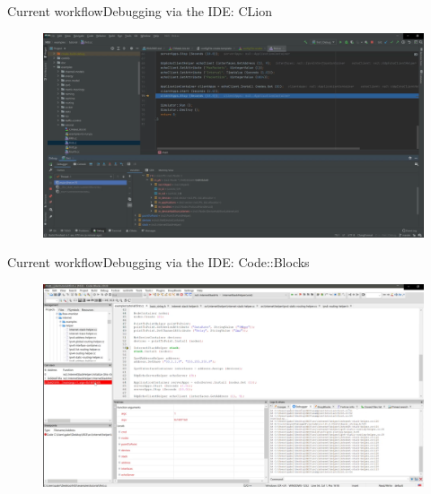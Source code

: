 \documentclass[12pt]{beamer}
\begin{document}
\begin{frame}{Current workflow}{Debugging via the IDE: CLion}
    \begin{figure}[h]
        \vspace{-2em}
        \hspace{-2em}
        \includegraphics[width=0.9\linewidth]{debug_clion.png}
    \end{figure}
\end{frame} 

\begin{frame}{Current workflow}{Debugging via the IDE: Code::Blocks}
    \begin{figure}[h]
        \vspace{-2em}
        \hspace{-2em}
        \includegraphics[width=0.9\linewidth]{debug_codeblocks.png}
    \end{figure}
\end{frame}  
\end{document}
